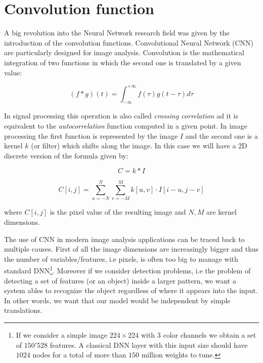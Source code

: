 \documentclass{standalone}
\begin{document}

\section[Convolution function]{Convolution function}\label{NN:convolutional}

A big revolution into the Neural Network research field was given by the introduction of the convolution functions.
Convolutional Neural Network (CNN) are particularly designed for image analysis.
Convolution is the mathematical integration of two functions in which the second one is translated by a given value:

$$
(f * g)(t) = \int_{-\infty}^{+\infty} f(\tau)g(t - \tau)d\tau
$$


In signal processing this operation is also called \emph{crossing correlation} ad it is equivalent to the \emph{autocorrelation} function computed in a given point.
In image processing the first function is represented by the image $I$ and the second one is a kernel $k$ (or filter) which shifts along the image.
In this case we will have a 2D discrete version of the formula given by:

$$
C = k * I
$$

$$
C[i, j] = \sum_{u=-N}^{N} \sum_{v=-M}^{M} k[u, v] \cdot I[i - u, j - v]
$$

where $C[i, j]$ is the pixel value of the resulting image and $N, M$ are kernel dimensions.

The use of CNN in modern image analysis applications can be traced back to multiple causes.
First of all the image dimensions are increasingly bigger and thus the number of variables/features, i.e pixels, is often too big to manage with standard DNN\footnote{
  If we consider a simple image $224\times224$ with $3$ color channels we obtain a set of $150'528$ features.
  A classical DNN layer with this input size should have $1024$ nodes for a total of more than $150$ million weights to tune.
}.
Moreover if we consider detection problems, i.e the problem of detecting a set of features (or an object) inside a larger pattern, we want a system ables to recognize the object regardless of where it appears into the input.
In other words, we want that our model would be independent by simple translations.
\end{document}
